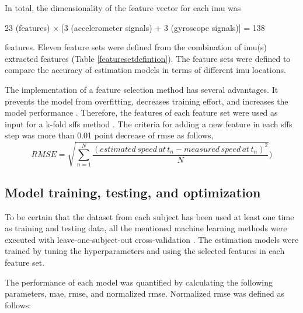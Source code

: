 

In total, the dimensionality of the feature vector for each \gls{imu} was 
\vspace*{-\baselineskip}
\begin{table}[H]
\centering

23 (features) $\times$ [3 (accelerometer signals) + 3 (gyroscope signals)] = 138\\[-1em]
\end{table}

\noindent features. Eleven feature sets were defined from the combination of \gls{imu}(s) extracted features (Table \ref{featuresetdefintion}). The feature sets were defined to compare the accuracy of estimation models in terms of different \gls{imu} locations.




The implementation of a feature selection method has several advantages. It prevents the model from overfitting, decreases training effort, and increases the model performance \cite{rehman_2019_selecting,articlejian}. Therefore, the features of each feature set were used as input for a k-fold \gls{sffs} method \cite{pudil_1994_floating}. The criteria for adding a new feature in each \gls{sffs} step was more than 0.01 point decrease of \gls{rmse} as follows,
\begin{equation}
RMSE = \sqrt{\sum_{n=1}^N \frac{(estimated\,speed\,at\,t_n - measured\,speed\,at\,t_n)^2}{N}})
\end{equation}

\subsection{Model training, testing, and optimization}
 To be certain that the dataset from each subject has been used at least one time as training and testing data, all the mentioned machine learning methods were executed with leave-one-subject-out cross-validation \cite{MANNINI20141312}. The estimation models were trained by tuning the hyperparameters and using the selected features in each feature set. 
 
 The performance of each model was quantified by calculating the following parameters, \gls{mae}, \gls{rmse}, and normalized \gls{rmse}. Normalized \gls{rmse} was defined as follows: 



